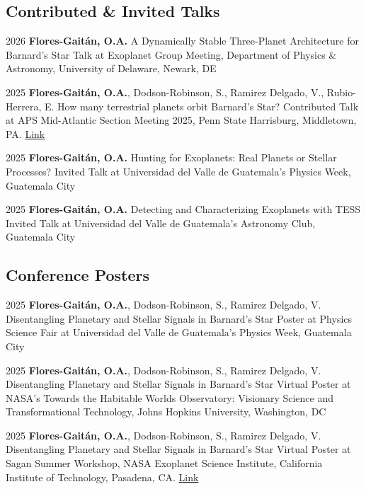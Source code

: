 \documentclass[11pt, a4paper]{article}
\begin{document}
\subsection*{Contributed \& Invited Talks}
\rubenzahlTalk
    {2026}
    {\textbf{Flores-Gaitán, O.A.}}
    {A Dynamically Stable Three-Planet Architecture for Barnard's Star}
    {Talk at Exoplanet Group Meeting, Department of Physics \& Astronomy, University of Delaware, Newark, DE}

\rubenzahlTalk
    {2025}
    {\textbf{Flores-Gaitán, O.A.}, Dodson-Robinson, S., Ramirez Delgado, V., Rubio-Herrera, E.}
    {How many terrestrial planets orbit Barnard's Star?}
    {Contributed Talk at APS Mid-Atlantic Section Meeting 2025, Penn State Harrisburg, Middletown, PA. \href{https://meetings.aps.org/Meeting/MAS25/Session/E05.5}{Link}}

\rubenzahlTalk
    {2025}
    {\textbf{Flores-Gaitán, O.A.}}
    {Hunting for Exoplanets: Real Planets or Stellar Processes?}
    {Invited Talk at Universidad del Valle de Guatemala's Physics Week, Guatemala City}

\rubenzahlTalk
    {2025}
    {\textbf{Flores-Gaitán, O.A.}}
    {Detecting and Characterizing Exoplanets with TESS}
    {Invited Talk at Universidad del Valle de Guatemala's Astronomy Club, Guatemala City}

\subsection*{Conference Posters}
\rubenzahlTalk
    {2025}
    {\textbf{Flores-Gaitán, O.A.}, Dodson-Robinson, S., Ramirez Delgado, V.}
    {Disentangling Planetary and Stellar Signals in Barnard’s Star}
    {Poster at Physics Science Fair at Universidad del Valle de Guatemala's Physics Week, Guatemala City}

\rubenzahlTalk
    {2025}
    {\textbf{Flores-Gaitán, O.A.}, Dodson-Robinson, S., Ramirez Delgado, V.}
    {Disentangling Planetary and Stellar Signals in Barnard’s Star}
    {Virtual Poster at NASA's Towards the Habitable Worlds Observatory: Visionary Science and Transformational Technology, Johns Hopkins University, Washington, DC}

\rubenzahlTalk
    {2025}
    {\textbf{Flores-Gaitán, O.A.}, Dodson-Robinson, S., Ramirez Delgado, V.}
    {Disentangling Planetary and Stellar Signals in Barnard’s Star}
    {Virtual Poster at Sagan Summer Workshop, NASA Exoplanet Science Institute, California Institute of Technology, Pasadena, CA. \href{https://nexsci.caltech.edu/workshop/2025/posters/Poster_OscarAndresFloresGaitan_102.pdf}{Link}}
\end{document}
